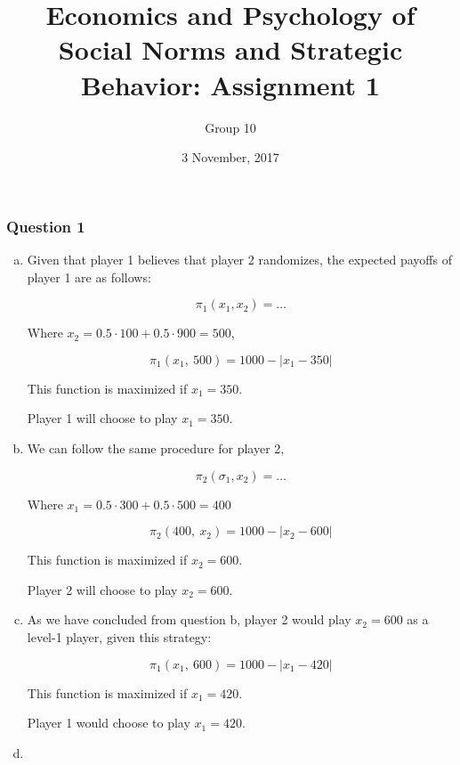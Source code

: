 \documentclass[a4paper]{article}
\author{Group 10}
\date{3 November, 2017}
\title{Economics and Psychology of Social Norms and Strategic Behavior: Assignment 1}
\begin{document}
\maketitle

\subsubsection{Question 1}


\begin{enumerate}[(a)]

\item
Given that player 1 believes that player 2 randomizes, the expected
payoffs of player 1 are as follows:

\[\pi_{1}\left( x_{1},x_{2} \right) = \ldots\]

Where \(x_{2} = 0.5 \cdot 100 + 0.5 \cdot 900 = 500\),

\[\pi_{1}\left( x_{1},\ 500 \right) = 1000 - |x_{1} - 350|\]

This function is maximized if \(x_{1} = 350\).

Player 1 will choose to play \(x_{1} = 350\).

\item

We can follow the same procedure for player 2,

\[\pi_{2}\left( \sigma_{1},x_{2} \right) = \ldots\]

Where \(x_{1} = 0.5 \cdot 300 + 0.5 \cdot 500 = 400\)

\[\pi_{2}\left( 400,\ x_{2} \right) = 1000 - |x_{2} - 600|\]

This function is maximized if \(x_{2} = 600\).

Player 2 will choose to play \(x_{2} = 600\).

\item

As we have concluded from question b, player 2 would play
\(x_{2} = 600\) as a level-1 player, given this strategy:

\[\pi_{1}\left( x_{1},\ 600 \right) = 1000 - |x_{1} - 420|\]

This function is maximized if \(x_{1} = 420\).

Player 1 would choose to play \(x_{1} = 420\).

\item


\end{enumerate}
\end{document}
